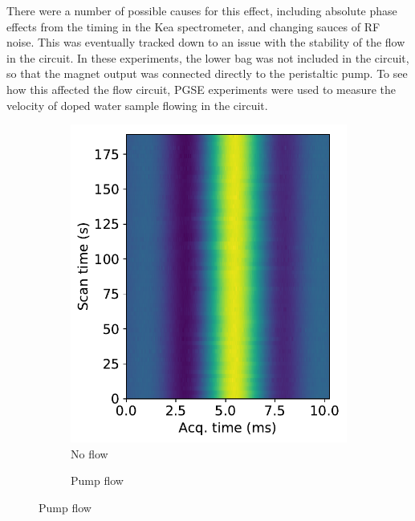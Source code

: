 There were a number of possible causes for this effect, including absolute phase effects from the timing in the Kea spectrometer, and changing sauces of RF  noise.
This was eventually tracked down to an issue with the stability of the flow in the circuit.
In these experiments, the lower bag was not included in the circuit, so that the magnet output was connected directly to the peristaltic pump.
To see how this affected the flow circuit, PGSE experiments were used to measure the velocity of doped water sample flowing in the circuit.

\begin{figure}[ht]
\centering
\begin{subfigure}[t]{0.32\textwidth}
\caption{No flow}
\includegraphics[width=\textwidth]{figures/contflow/flowstabilitynoflow.pdf}
\end{subfigure}
\begin{subfigure}[t]{0.32\textwidth}
\caption{Pump flow}

\end{subfigure}
\end{figure}
